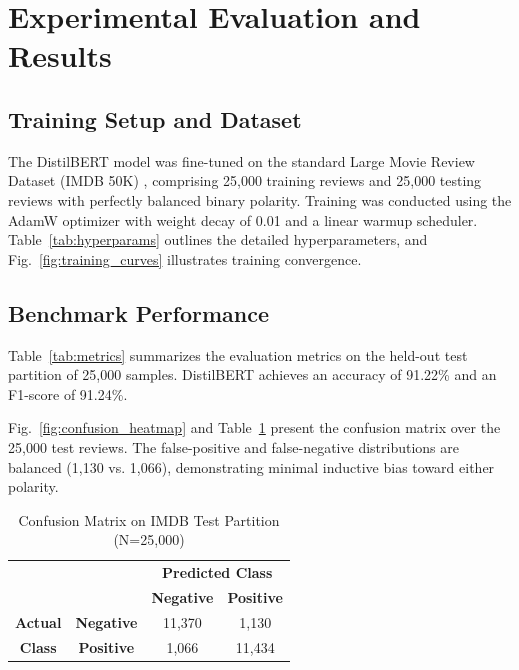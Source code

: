 \documentclass[conference]{IEEEtran}
\begin{document}
\section{Experimental Evaluation and Results}

\subsection{Training Setup and Dataset}
The DistilBERT model was fine-tuned on the standard Large Movie Review Dataset (IMDB 50K) \cite{maas2011learning}, comprising 25,000 training reviews and 25,000 testing reviews with perfectly balanced binary polarity. Training was conducted using the AdamW optimizer with weight decay of 0.01 and a linear warmup scheduler. Table~\ref{tab:hyperparams} outlines the detailed hyperparameters, and Fig.~\ref{fig:training_curves} illustrates training convergence.

\subsection{Benchmark Performance}
Table~\ref{tab:metrics} summarizes the evaluation metrics on the held-out test partition of 25,000 samples. DistilBERT achieves an accuracy of 91.22\% and an F1-score of 91.24\%. 

Fig.~\ref{fig:confusion_heatmap} and Table~\ref{tab:confusion} present the confusion matrix over the 25,000 test reviews. The false-positive and false-negative distributions are balanced (1,130 vs. 1,066), demonstrating minimal inductive bias toward either polarity.

\begin{table}[t]
\caption{Confusion Matrix on IMDB Test Partition (N=25,000)}
\begin{center}
\begin{tabular}{cc|cc}
\toprule
& & \multicolumn{2}{c}{\textbf{Predicted Class}} \\
& & \textbf{Negative} & \textbf{Positive} \\
\midrule
\textbf{Actual} & \textbf{Negative} & 11,370 & 1,130 \\
\textbf{Class}  & \textbf{Positive} & 1,066 & 11,434 \\
\bottomrule
\end{tabular}
\label{tab:confusion}
\end{center}
\end{table}
\end{document}
